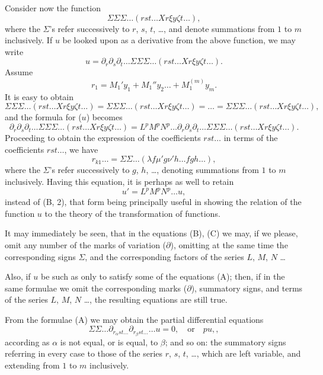 \documentclass[11pt,a4paper]{article}
\theoremstyle{plain}
\theoremstyle{definition}
\theoremstyle{remark}
\begin{document}
Consider now the function
\[
\Sigma \Sigma \Sigma \ldots (rst\ldots X r\xi y\zeta t\ldots)
\tag{19},
\]
where the $\Sigma$'s refer successively to $r$, $s$, $t$, \ldots, and denote summations from $1$ to $m$
inclusively. If $u$ be looked upon as a derivative from the above function, we may write
\[
u = \partial_r \partial_s \partial_t \ldots \Sigma\Sigma\Sigma\ldots(rst\ldots X r\xi y\zeta t\ldots)
\tag{20}.
\]
Assume
\[
r_1 = M_1' y_1 + M_1'' y_2 \ldots + M_1^{(m)} y_m
\tag{21}.
\]
It is easy to obtain
\[
\Sigma \Sigma \Sigma \ldots (rst\ldots X r\xi y\zeta t\ldots) = \Sigma \Sigma \Sigma \ldots (rst\ldots X r\xi y\zeta t\ldots) = \ldots
= \Sigma \Sigma \Sigma \ldots (rst\ldots X r\xi y\zeta t\ldots)
\tag{22},
\]
and the formula for ($u$) becomes
\[
\partial_r \partial_s \partial_t \ldots \Sigma\Sigma\Sigma\ldots(rst\ldots X r\xi y\zeta t\ldots) = L^p M^p N^p \ldots
\partial_r \partial_s \partial_t \ldots \Sigma\Sigma\Sigma\ldots(rst\ldots X r\xi y\zeta t\ldots)
\tag{B, 2}.
\]
Proceeding to obtain the expression of the coefficients $rst\ldots$ in terms of the
coefficients $rst\ldots$, we have
\[
r_{k1}\ldots = \Sigma \Sigma \ldots (\lambda f \mu' g \nu' h \ldots fgh\ldots)
\tag{C},
\]
where the $\Sigma$'s refer successively to $g$, $h$, \ldots, denoting summations from $1$ to $m$
inclusively. Having this equation, it is perhaps as well to retain
\[
u' = L^p M^p N^p \ldots u
\tag{B, 1},
\]
instead of (B, 2), that form being principally useful in showing the relation of the
function $u$ to the theory of the transformation of functions.

It may immediately be seen, that in the equations (B), (C) we may, if we please,
omit any number of the marks of variation ($\partial$), omitting at the same time the
corresponding signs $\Sigma$, and the corresponding factors of the series $L$, $M$, $N$ \ldots

Also, if $u$ be such as only to satisfy some of the equations (A); then, if in the
same formulae we omit the corresponding marks ($\partial$), summatory signs, and terms of the
series $L$, $M$, $N$ \ldots, the resulting equations are still true.

From the formulae (A) we may obtain the partial differential equations
\[
\Sigma \Sigma \ldots \partial_{r_\alpha st\ldots} \partial_{r_\beta st\ldots} \ldots u = 0, \quad \text{or} \quad pu,
\tag{D},
\]
according as $\alpha$ is not equal, or is equal, to $\beta$;
and so on: the summatory signs referring in every case to those of the series $r$, $s$, $t$, \ldots,
which are left variable, and extending from $1$ to $m$ inclusively.
\end{document}
